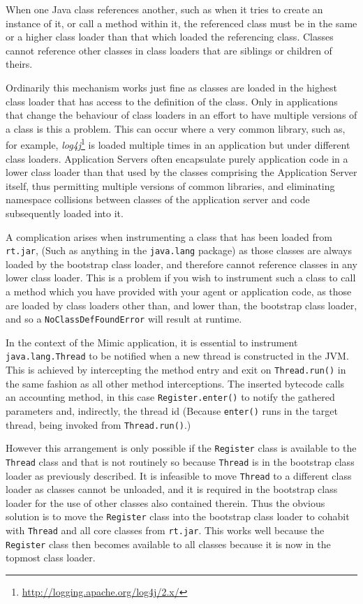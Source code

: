 \documentclass[]{final_report}
\begin{document}
When one Java class references another, such as when it tries to create an instance of it, or call a method within it, the referenced class must be in the same or a higher class loader than that which loaded the referencing class. Classes cannot reference other classes in class loaders that are siblings or children of theirs.

Ordinarily this mechanism works just fine as classes are loaded in the highest class loader that has access to the definition of the class. Only in applications that change the behaviour of class loaders in an effort to have multiple versions of a class is this a problem. This can occur where a very common library, such as, for example, \textit{log4j}\footnote{\url{http://logging.apache.org/log4j/2.x/}} is loaded multiple times in an application but under different class loaders. Application Servers often encapsulate purely application code in a lower class loader than that used by the  classes comprising the Application Server itself, thus permitting multiple versions of common libraries, and eliminating namespace collisions between classes of the application server and code subsequently loaded into it.

A complication arises when instrumenting a class that has been loaded from \lstinline{rt.jar}, (Such as anything in the \lstinline{java.lang} package) as those classes are always loaded by the bootstrap class loader, and therefore cannot reference classes in any lower class loader. This is a problem if you wish to instrument such a class to call a method which you have provided with your agent or application code, as those are loaded by class loaders other than, and lower than, the bootstrap class loader, and so a \lstinline{NoClassDefFoundError}\noop{} will result at runtime.

In the context of the Mimic application, it is essential to instrument \lstinline{java.lang.Thread} to be notified when a new thread is constructed in the JVM. This is achieved by intercepting the method entry and exit on \lstinline{Thread.run()} in the same fashion as all other method interceptions. The inserted bytecode calls an accounting method, in this case \lstinline{Register.enter()} to notify the gathered parameters and, indirectly, the thread id (Because \lstinline{enter()} runs in the target thread, being invoked from \lstinline{Thread.run()}.)\noop{}

However this arrangement is only possible if the \lstinline{Register} class is available to the \lstinline{Thread} class and that is not routinely so because \lstinline{Thread} is in the bootstrap class loader as previously described. It is infeasible to move \lstinline{Thread} to a different class loader as classes cannot be unloaded, and it is required in the bootstrap class loader for the use of other classes also contained therein. Thus the obvious solution is to move the \lstinline{Register} class into the bootstrap class loader to cohabit with \lstinline{Thread} and all core classes from \lstinline{rt.jar}. This works well because the \lstinline{Register} class then becomes available to all classes because it is now in the topmost class loader.
\end{document}
